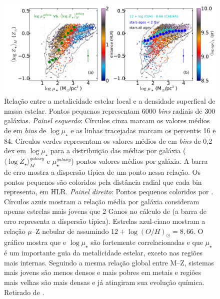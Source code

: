 \begin{figure}
  \includegraphics[scale=0.35]{figuras/Fig_age_logZ_zonas_Bgsd01.pdf}
  \caption[ $\times\ \log \mu_\star$]
  {Relação entre a metalicidade estelar local e a densidade superfical de massa estelar. Pontos pequenos representam 6000 {\em bins} radiais de 300 galáxias. {\em Painel esquerdo}: Círculos cinza marcam os valores médios de  em {\em bins} de $\log \mu_\star$ e as linhas tracejadas marcam os percentis 16 e 84. Círculos verdes representam os valores médios de  em {\em bins} de 0,2 dex em $\log \mu_\star$ para a distribuição das médias por galáxia ($\langle \log Z_\star \rangle_M^{galaxy}$ e $\mu_\star^{galaxy}$) pontos valores médios por galáxia. A barra de erro mostra a dispersão típica de um ponto nessa relação. Os pontos pequenos são coloridos pela distância radial que cada bin representa, em HLR. {\em Painel direito}: Pontos pequenos coloridos por . Círculos azuis mostram a relação média por galáxia consideram apenas estrelas mais jovens que 2 Ganos no cálculo de  (a barra de erro representa a dispersão típica). Estrelas azul-ciano mostram a relação $\mu$--Z nebular de \citet{Sanchez.etal.2013a} assumindo $12+ \log (O/H)_\odot = 8,66$. O gráfico mostra que  e $\log \mu_\star$ são fortemente correlacionadas e que $\mu_\star$ é um importante guia da metalicidade estelar, exceto nas regiões mais internas. Seguindo a mesma relação global entre M--Z, sistemas mais jovens são menos densos e mais pobres em metais e regiões mais velhas são mais densas e já atingiram sua evolução química. Retirado de \citet{GonzalezDelgado.etal.2014b}.}
  \label{fig:McorSD_logZ_zonas}
\end{figure}


